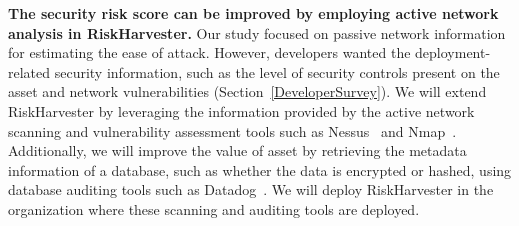 \textbf{The security risk score can be improved by employing active network analysis in RiskHarvester.} Our study focused on passive network information for estimating the ease of attack. However, developers wanted the deployment-related security information, such as the level of security controls present on the asset and network vulnerabilities (Section~\ref{DeveloperSurvey}). We will extend RiskHarvester by leveraging the information provided by the active network scanning and vulnerability assessment tools such as Nessus~\cite{nessus} and Nmap~\cite{nmap}. Additionally, we will improve the value of asset by retrieving the metadata information of a database, such as whether the data is encrypted or hashed, using database auditing tools such as Datadog~\cite{datadog}. We will deploy RiskHarvester in the organization where these scanning and auditing tools are deployed.
